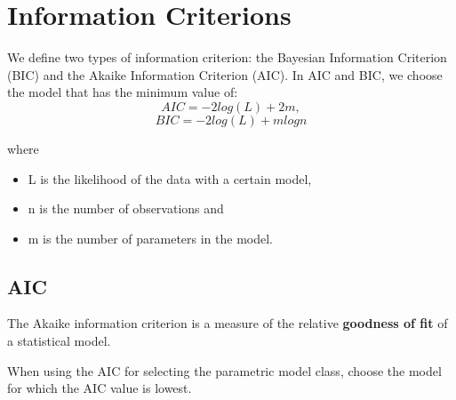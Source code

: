 \documentclass[a4paper,12pt]{article}
\begin{document}
\section{Information Criterions}


We define two types of information criterion: the Bayesian Information
Criterion (BIC) and the Akaike Information Criterion (AIC). In AIC and BIC, we choose the model that
has the minimum value of:
\[AIC = −2log(L)+2m,\]
\[BIC = −2log(L)+mlogn\]

where
\begin{itemize}
\item L is the likelihood of the data with a certain model,
\item n is the number of observations and
\item m is the number of parameters in the model.
\end{itemize}
\subsection{AIC}
The Akaike information criterion is a measure of the relative \textbf{goodness of fit} of a statistical model.

When using the AIC for selecting the parametric model class, choose
the model for which the AIC value is lowest.
\end{document}
